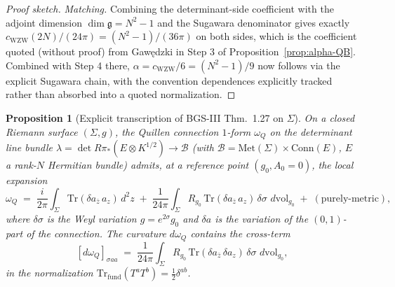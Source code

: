 \documentclass[11pt,letterpaper]{article}
\newtheorem{proposition}[theorem]{Proposition}
\theoremstyle{definition}
\newcommand{\fg}{\mathfrak{g}}
\newcommand{\Tr}{\mathrm{Tr}}
\newcommand{\dvol}{\,d\mathrm{vol}}
\begin{document}
\begin{proof}[Proof sketch]
\emph{Matching.} Combining the determinant-side coefficient with the adjoint dimension $\dim\fg = N^2 - 1$ and the Sugawara denominator gives exactly $c_{\mathrm{WZW}}(2N)/(24\pi) = (N^2-1)/(36\pi)$ on both sides, which is the coefficient quoted (without proof) from Gaw\k{e}dzki in Step 3 of Proposition~\ref{prop:alpha-QB}. Combined with Step 4 there, $\alpha = c_{\mathrm{WZW}}/6 = (N^2-1)/9$ now follows via the explicit Sugawara chain, with the convention dependences explicitly tracked rather than absorbed into a quoted normalization.
\end{proof}

\begin{proposition}[Explicit transcription of BGS-III Thm.\ 1.27 on $\Sigma$]\label{prop:BGS-127-transcription}
On a closed Riemann surface $(\Sigma, g)$, the Quillen connection $1$-form $\omega_Q$ on the determinant line bundle $\lambda = \det R\pi_*(E\otimes K^{1/2}) \to \mathcal{B}$ (with $\mathcal{B} = \mathrm{Met}(\Sigma)\times\mathrm{Conn}(E)$, $E$ a rank-$N$ Hermitian bundle) admits, at a reference point $(g_0, A_0 = 0)$, the local expansion
\begin{equation}\label{eq:BGS-127-omega}
\omega_Q \;=\; \frac{i}{2\pi}\int_\Sigma \Tr(\delta a_{\bar z}\, a_z)\,d^2z \;+\; \frac{1}{24\pi}\int_\Sigma R_{g_0}\,\Tr(\delta a_{\bar z}\, a_z)\,\delta\sigma\,\dvol_{g_0} \;+\; (\text{purely-metric}),
\end{equation}
where $\delta\sigma$ is the Weyl variation $g = e^{2\sigma}g_0$ and $\delta a$ is the variation of the $(0,1)$-part of the connection. The curvature $d\omega_Q$ contains the cross-term
\begin{equation}\label{eq:BGS-127-cross}
[d\omega_Q]_{\sigma a a} \;=\; \frac{1}{24\pi}\int_\Sigma R_{g_0}\,\Tr(\delta a_{\bar z}\,\delta a_z)\,\delta\sigma\,\dvol_{g_0},
\end{equation}
in the normalization $\Tr_{\mathrm{fund}}(T^a T^b) = \tfrac{1}{2}\delta^{ab}$.
\end{proposition}
\end{document}
